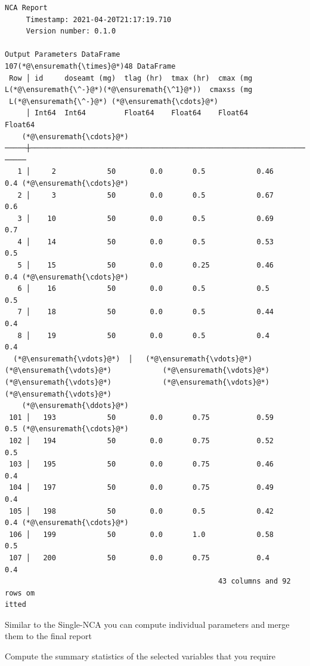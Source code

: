 \documentclass[12pt,a4paper]{article}
\begin{document}
\begin{lstlisting}
NCA Report
     Timestamp: 2021-04-20T21:17:19.710
     Version number: 0.1.0

Output Parameters DataFrame
107(*@\ensuremath{\times}@*)48 DataFrame
 Row │ id     doseamt (mg)  tlag (hr)  tmax (hr)  cmax (mg L(*@\ensuremath{\^-}@*)(*@\ensuremath{\^1}@*))  cmaxss (mg
 L(*@\ensuremath{\^-}@*) (*@\ensuremath{\cdots}@*)
     │ Int64  Int64         Float64    Float64    Float64        Float64   
    (*@\ensuremath{\cdots}@*)
─────┼─────────────────────────────────────────────────────────────────────
─────
   1 │     2            50        0.0       0.5            0.46            
0.4 (*@\ensuremath{\cdots}@*)
   2 │     3            50        0.0       0.5            0.67            
0.6
   3 │    10            50        0.0       0.5            0.69            
0.7
   4 │    14            50        0.0       0.5            0.53            
0.5
   5 │    15            50        0.0       0.25           0.46            
0.4 (*@\ensuremath{\cdots}@*)
   6 │    16            50        0.0       0.5            0.5             
0.5
   7 │    18            50        0.0       0.5            0.44            
0.4
   8 │    19            50        0.0       0.5            0.4             
0.4
  (*@\ensuremath{\vdots}@*)  │   (*@\ensuremath{\vdots}@*)         (*@\ensuremath{\vdots}@*)            (*@\ensuremath{\vdots}@*)          (*@\ensuremath{\vdots}@*)            (*@\ensuremath{\vdots}@*)               (*@\ensuremath{\vdots}@*)  
    (*@\ensuremath{\ddots}@*)
 101 │   193            50        0.0       0.75           0.59            
0.5 (*@\ensuremath{\cdots}@*)
 102 │   194            50        0.0       0.75           0.52            
0.5
 103 │   195            50        0.0       0.75           0.46            
0.4
 104 │   197            50        0.0       0.75           0.49            
0.4
 105 │   198            50        0.0       0.5            0.42            
0.4 (*@\ensuremath{\cdots}@*)
 106 │   199            50        0.0       1.0            0.58            
0.5
 107 │   200            50        0.0       0.75           0.4             
0.4
                                                  43 columns and 92 rows om
itted
\end{lstlisting}


Similar to the Single-NCA you can compute individual parameters and merge them to the final report

Compute the summary statistics of the selected variables that you require
\end{document}
